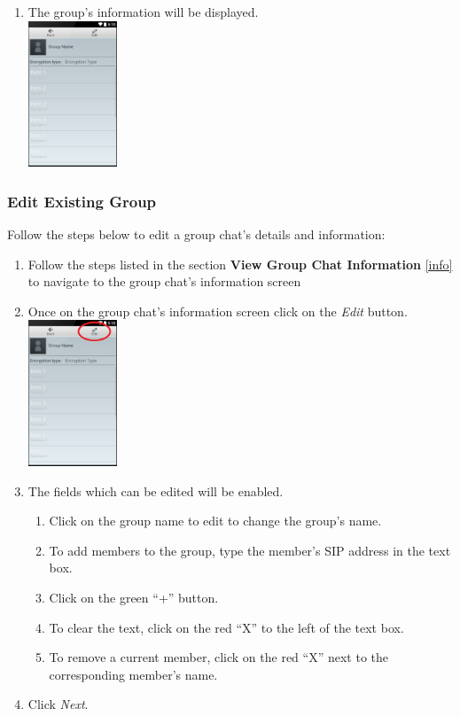\documentclass[11pt]{article}
\begin{document}
\begin{enumerate}
\item The group's information will be displayed.\\
\includegraphics[width=100px]{images/groupchatInfoDisp.png}
\end{enumerate}

\subsubsection{Edit Existing Group}  \label{edit}
Follow the steps below to edit a group chat's details and information:
\begin{enumerate}
\item Follow the steps listed in the section \textbf{View Group Chat Information} \ref{info} to navigate to the group chat's information screen
\item Once on the group chat's information screen click on the \textit{Edit} button.\\
\includegraphics[width=100px]{images/groupchatInfoEdit.png}
\item The fields which can be edited will be enabled.
\begin{enumerate}
\item Click on the group name to edit to change the group's name.
\item To add members to the group, type the member's SIP address in the text box.\label{edit-3c}
\item Click on the green \enquote{+} button.
\item To clear the text, click on the red \enquote{X} to the left of the text box.\label{edit-3e}
\item To remove a current member, click on the red \enquote{X} next to the corresponding member's name.\label{edit-3f}
\end{enumerate}
\item Click \textit{Next}.
\end{enumerate}
\end{document}
